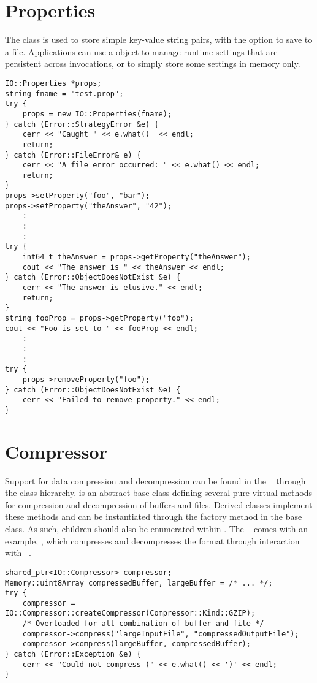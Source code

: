 \section{Properties}
\label{sec-properties}
The  class is used to store simple key-value string pairs, with the
option to save to a file. Applications can use a  object to manage
runtime settings that are persistent across invocations, or to simply store
some settings in memory only.

\begin{lstlisting}[caption={Using a \class{Properties} Object}, label=lst:propertiesuse]
IO::Properties *props;
string fname = "test.prop";
try {
    props = new IO::Properties(fname);
} catch (Error::StrategyError &e) {
    cerr << "Caught " << e.what()  << endl;
    return;
} catch (Error::FileError& e) {
    cerr << "A file error occurred: " << e.what() << endl;
    return;
}
props->setProperty("foo", "bar");
props->setProperty("theAnswer", "42");
    :
    :
    :
try {
    int64_t theAnswer = props->getProperty("theAnswer");
    cout << "The answer is " << theAnswer << endl;
} catch (Error::ObjectDoesNotExist &e) {
    cerr << "The answer is elusive." << endl;
    return;
}
string fooProp = props->getProperty("foo");
cout << "Foo is set to " << fooProp << endl;
    :
    :
    :
try {
    props->removeProperty("foo");
} catch (Error::ObjectDoesNotExist &e) {
    cerr << "Failed to remove property." << endl;
}
\end{lstlisting}

\section{Compressor}
\label{sec-compressor}

Support for data compression and decompression can be found in the
\lname~ through the  class hierarchy.   is
an abstract base class defining several pure-virtual methods for compression
and decompression of buffers and files.  Derived classes implement these methods
and can be instantiated through the factory method in the base class.
As such, children should also be enumerated within . 
The \lname~ comes with an example, , which compresses and
decompresses the  format through interaction with
~\cite{zlib}.

\begin{lstlisting}[caption={Using a \class{Compressor} Object}, label=lst:compressoruse]
shared_ptr<IO::Compressor> compressor;
Memory::uint8Array compressedBuffer, largeBuffer = /* ... */;
try {
	compressor = IO::Compressor::createCompressor(Compressor::Kind::GZIP);
	/* Overloaded for all combination of buffer and file */
	compressor->compress("largeInputFile", "compressedOutputFile");
	compressor->compress(largeBuffer, compressedBuffer);
} catch (Error::Exception &e) {
	cerr << "Could not compress (" << e.what() << ')' << endl;
}
\end{lstlisting}

